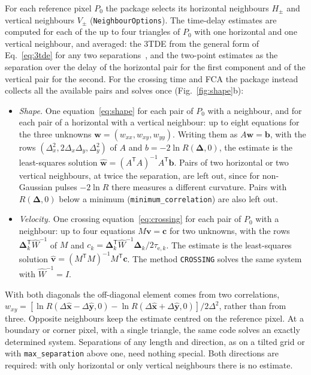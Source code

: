 \documentclass[aps,pre,11pt,a4paper,preprint,amsmath,amssymb,groupedaddress]{revtex4-2}
\newcommand{\Eqref}[1]{Eq.~\eqref{#1}}
\newcommand{\Figref}[1]{Fig.~\ref{#1}}
\newcommand{\wh}{\widehat}
\newcommand{\bv}{\ensuremath{\bm{v}}}
\newcommand{\bD}{\ensuremath{\bm{\Delta}}}
\newcommand{\bex}{\ensuremath{\hat{\bm{x}}}}
\newcommand{\bey}{\ensuremath{\hat{\bm{y}}}}
\newcommand{\T}{\ensuremath{\mathsf{T}}}
\newcommand{\w}[1]{\ensuremath{w_{#1}}}
\newcommand{\code}[1]{\texttt{#1}}
\begin{document}
For each reference pixel $P_0$ the package selects its horizontal neighbours $H_\pm$ and vertical neighbours $V_\pm$ (\code{NeighbourOptions}). The time-delay estimates are computed for each of the up to four triangles of $P_0$ with one horizontal and one vertical neighbour, and averaged: the 3TDE from the general form of \Eqref{eq:3tde} for any two separations~\cite{losada_three-point_2024}, and the two-point estimates as the separation over the delay of the horizontal pair for the first component and of the vertical pair for the second. For the crossing time and FCA the package instead collects all the available pairs and solves once (\Figref{fig:shape}b):
%
\begin{itemize}
\item \emph{Shape.} One equation~\eqref{eq:shape} for each pair of $P_0$ with a neighbour, and for each pair of a horizontal with a vertical neighbour: up to eight equations for the three unknowns $\bm{w} = (\w{xx}, \w{xy}, \w{yy})$. Writing them as $A\bm{w} = \bm{b}$, with the rows $(\Delta_x^2, 2\Delta_x\Delta_y, \Delta_y^2)$ of $A$ and $b = -2\ln R(\bD, 0)$, the estimate is the least-squares solution $\wh{\bm{w}} = (A^\T A)^{-1}A^\T\bm{b}$. Pairs of two horizontal or two vertical neighbours, at twice the separation, are left out, since for non-Gaussian pulses $-2\ln R$ there measures a different curvature. Pairs with $R(\bD,0)$ below a minimum (\code{minimum\_correlation}) are also left out.
\item \emph{Velocity.} One crossing equation~\eqref{eq:crossing} for each pair of $P_0$ with a neighbour: up to four equations $M\bv = \bm{c}$ for two unknowns, with the rows $\bD_k^\T\wh{W}^{-1}$ of $M$ and $c_k = \bD_k^\T\wh{W}^{-1}\bD_k/2\tau_{\text{e},k}$. The estimate is the least-squares solution $\wh{\bv} = (M^\T M)^{-1}M^\T\bm{c}$. The method \code{CROSSING} solves the same system with $\wh{W}^{-1} = I$.
\end{itemize}
%
With both diagonals the off-diagonal element comes from two correlations, $\w{xy} = [\ln R(\Delta\bex - \Delta\bey, 0) - \ln R(\Delta\bex + \Delta\bey, 0)]/2\Delta^2$, rather than from three. Opposite neighbours keep the estimate centred on the reference pixel. At a boundary or corner pixel, with a single triangle, the same code solves an exactly determined system. Separations of any length and direction, as on a tilted grid or with \code{max\_separation} above one, need nothing special. Both directions are required: with only horizontal or only vertical neighbours there is no estimate.
\end{document}
